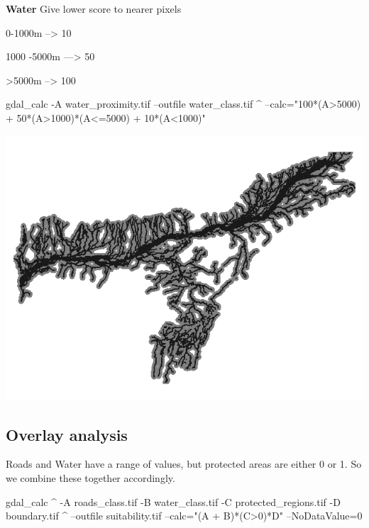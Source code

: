 \documentclass[12pt,a4paper]{article}
\newenvironment{Shaded}{\begin{snugshade}}{\end{snugshade}}
\newcommand{\ExtensionTok}[1]{#1}
\newcommand{\NormalTok}[1]{#1}
\newcommand{\StringTok}[1]{\textcolor[rgb]{0.31,0.60,0.02}{#1}}
\begin{document}
\textbf{Water} Give lower score to nearer pixels

0-1000m --\textgreater{} 10

1000 -5000m ---\textgreater{} 50

\textgreater5000m --\textgreater{} 100

\begin{Shaded}
\begin{Highlighting}[]
\ExtensionTok{gdal_calc}\NormalTok{ -A water_proximity.tif --outfile water_class.tif ^}
  \ExtensionTok{--calc}\NormalTok{=}\StringTok{"100*(A>5000) + 50*(A>1000)*(A<=5000) + 10*(A<1000)"}
\end{Highlighting}
\end{Shaded}

\begin{center}\includegraphics{images/gdal/water_class} \end{center}

\hypertarget{overlay-analysis}{%
\subsection{Overlay analysis}\label{overlay-analysis}}

Roads and Water have a range of values, but protected areas are either 0
or 1. So we combine these together accordingly.

\begin{Shaded}
\begin{Highlighting}[]
\ExtensionTok{gdal_calc}\NormalTok{ ^}
  \ExtensionTok{-A}\NormalTok{ roads_class.tif -B water_class.tif -C protected_regions.tif -D boundary.tif ^}
  \ExtensionTok{--outfile}\NormalTok{ suitability.tif --calc=}\StringTok{"(A + B)*(C>0)*D"}\NormalTok{ --NoDataValue=0}
\end{Highlighting}
\end{Shaded}
\end{document}
